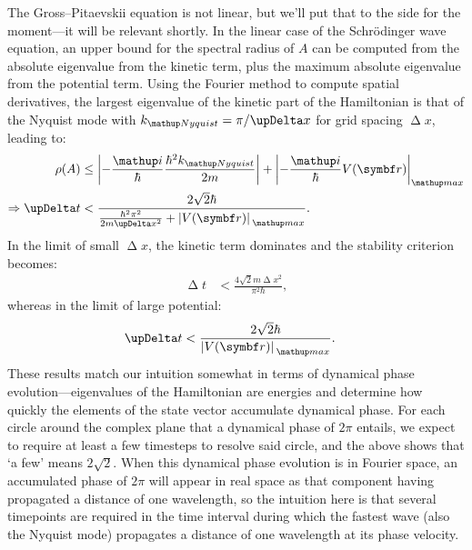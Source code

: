 The Gross--Pitaevskii equation is not linear, but we'll put that to the side for the moment---it will be relevant shortly. In the linear case of the Schr\"odinger wave equation, an upper bound for the spectral radius of $A$ can be computed from the absolute eigenvalue from the kinetic term, plus the maximum absolute eigenvalue from the potential term. Using the Fourier method to compute spatial derivatives, the largest eigenvalue of the kinetic part of the Hamiltonian is that of the Nyquist mode with $k_\up{Nyquist} = \pi / \upDelta x$ for grid spacing $\upDelta x$, leading to:
\begin{align}
\rho(A) &\leq \Abs{-\frac \ii \hbar \frac{\hbar^2 k_\up{Nyquist}}{2m}}
+ \Abs{-\frac \ii \hbar V(\vec r)}_\up{max}\\
\Rightarrow \upDelta t &< \frac{2\sqrt 2 \hbar}
{\frac{\hbar^2\pi^2}{2m \upDelta x^2} + \abs{V(\vec r)}_\up{max}}.
\end{align}
In the limit of small $\upDelta x$, the kinetic term dominates and the stability criterion becomes:
\begin{align}\label{eq:rk4_kinetic_stability}
\upDelta t &< \frac{4\sqrt 2 m \upDelta x^2}{\pi^2 \hbar},
\end{align}
whereas in the limit of large potential:
\begin{align}
\upDelta t &< \frac{2\sqrt 2\hbar}{\abs{V(\vec r)}_\up{max}}.
\end{align}
These results match our intuition somewhat in terms of dynamical phase evolution---eigenvalues of the Hamiltonian are energies and determine how quickly the elements of the state vector accumulate dynamical phase. For each circle around the complex plane that a dynamical phase of $2\pi$ entails, we expect to require at least a few timesteps to resolve said circle, and the above shows that `a few' means $2\sqrt{2}$. When this dynamical phase evolution is in Fourier space, an accumulated phase of $2\pi$ will appear in real space as that component having propagated a distance of one wavelength, so the intuition here is that several timepoints are required in the time interval during which the fastest wave (also the Nyquist mode) propagates a distance of one wavelength at its phase velocity.

